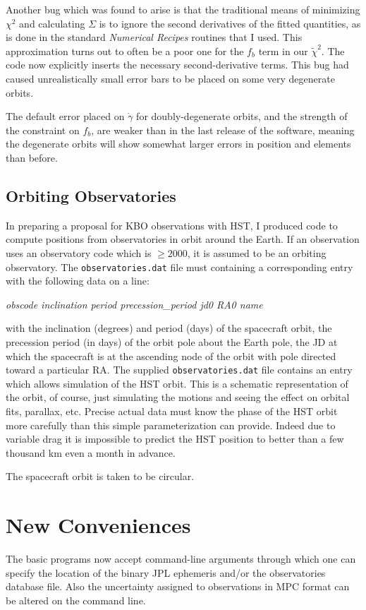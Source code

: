 Another bug which was found to arise is that the traditional means of
minimizing $\chi^2$ and calculating $\Sigma$ is to ignore the second
derivatives of the fitted quantities, as is done in the standard {\it
Numerical Recipes} routines that I used.  This approximation turns out
to often be a poor one for the $f_b$ term in our $\tilde\chi^2$.  The
code now explicitly inserts the necessary second-derivative terms.
This bug had caused unrealistically small error bars to be placed on
some very degenerate orbits.

The default error placed on $\dot\gamma$ for doubly-degenerate orbits,
and the strength of the constraint on $f_b$, are weaker than in the
last release of the software, meaning the degenerate orbits will show
somewhat larger errors in position and elements than before.

\subsection{Orbiting Observatories}
In preparing a proposal for KBO observations with HST, I produced code
to compute positions from observatories in orbit around the Earth.  If
an observation uses an observatory code which is $\ge2000$, it is
assumed to be an orbiting observatory.  The {\tt observatories.dat}
file must containing a corresponding entry with the following data on
a line:

\noindent
{\it obscode   inclination  period  precession\_period  jd0  RA0  name}

\noindent
with the inclination (degrees) and period (days) of the spacecraft
orbit, the precession period (in days) of the orbit pole
about the Earth pole, the JD at which the spacecraft is at the
ascending node of the orbit with pole directed toward a particular
RA.  The supplied {\tt observatories.dat} file contains an entry which
allows simulation of the HST orbit.  This is a schematic
representation of the orbit, of course, just simulating the motions
and seeing the effect on orbital fits, parallax, etc.
Precise actual data must know the phase of the HST orbit more
carefully than this simple parameterization can provide.  Indeed due
to variable drag it is impossible to predict the HST position to
better than a few thousand km even a month in advance.

The spacecraft orbit is taken to be circular.

\section{New Conveniences}
The basic programs now accept command-line arguments through which one
can specify the location of the binary JPL ephemeris and/or the
observatories database file.  Also the uncertainty assigned to
observations in MPC format can be altered on the command line.

